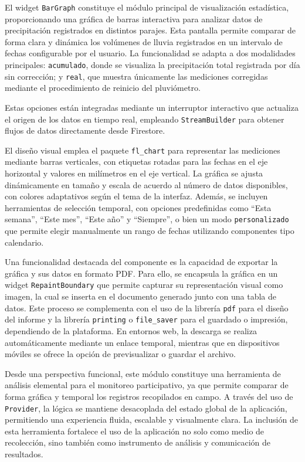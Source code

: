 El widget \texttt{BarGraph} constituye el módulo principal de visualización estadística, proporcionando una gráfica de barras interactiva para analizar datos de precipitación registrados en distintos parajes. Esta pantalla permite comparar de forma clara y dinámica los volúmenes de lluvia registrados en un intervalo de fechas configurable por el usuario. La funcionalidad se adapta a dos modalidades principales: \texttt{acumulado}, donde se visualiza la precipitación total registrada por día sin corrección; y \texttt{real}, que muestra únicamente las mediciones corregidas mediante el procedimiento de reinicio del pluviómetro. 

Estas opciones están integradas mediante un interruptor interactivo que actualiza el origen de los datos en tiempo real, empleando \texttt{StreamBuilder} para obtener flujos de datos directamente desde Firestore.

El diseño visual emplea el paquete \texttt{fl\_chart} para representar las mediciones mediante barras verticales, con etiquetas rotadas para las fechas en el eje horizontal y valores en milímetros en el eje vertical. La gráfica se ajusta dinámicamente en tamaño y escala de acuerdo al número de datos disponibles, con colores adaptativos según el tema de la interfaz. Además, se incluyen herramientas de selección temporal, con opciones predefinidas como ``Esta semana'', ``Este mes'', ``Este año'' y ``Siempre'', o bien un modo \texttt{personalizado} que permite elegir manualmente un rango de fechas utilizando componentes tipo calendario.

Una funcionalidad destacada del componente es la capacidad de exportar la gráfica y sus datos en formato PDF. Para ello, se encapsula la gráfica en un widget \texttt{RepaintBoundary} que permite capturar su representación visual como imagen, la cual se inserta en el documento generado junto con una tabla de datos. Este proceso se complementa con el uso de la librería \texttt{pdf} para el diseño del informe y la librería \texttt{printing} o \texttt{file\_saver} para el guardado o impresión, dependiendo de la plataforma. En entornos web, la descarga se realiza automáticamente mediante un enlace temporal, mientras que en dispositivos móviles se ofrece la opción de previsualizar o guardar el archivo.

Desde una perspectiva funcional, este módulo constituye una herramienta de análisis elemental para el monitoreo participativo, ya que permite comparar de forma gráfica y temporal los registros recopilados en campo. A través del uso de \texttt{Provider}, la lógica se mantiene desacoplada del estado global de la aplicación, permitiendo una experiencia fluida, escalable y visualmente clara. La inclusión de esta herramienta fortalece el uso de la aplicación no solo como medio de recolección, sino también como instrumento de análisis y comunicación de resultados.



